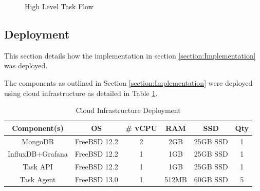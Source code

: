 \documentclass{mscreport}
\begin{document}

\begin{figure}[p]
	\begin{center}
		\caption{High Level Task Flow}
		\label{fig:task_flow}
	\end{center}
\end{figure}

\clearpage
\newpage

\subsection{Deployment}

This section details how the implementation in section \ref{section:Implementation} was deployed.

\vspace{0.3cm} \noindent
The components as outlined in Section \ref{section:Implementation} were deployed using cloud infrastructure as detailed in Table \ref{table:implmentation_cloud}.

\begin{table}[H]
  \begin{center}
    \begin{tabular}{|c|c|c|c|c|c|}  %
      \hline
      \textbf{Component(s)} & \textbf{OS} & \textbf{\# vCPU} & \textbf{RAM} & \textbf{SSD} & \textbf{Qty}\\
      \hline
      MongoDB & FreeBSD 12.2 & 2 & 2GB & 25GB SSD & 1 \\
      \hline
      InfluxDB$+$Grafana & FreeBSD 12.2 & 1 & 1GB & 25GB SSD & 1 \\
      \hline
      Task API & FreeBSD 12.2 & 1 & 1GB & 25GB SSD & 1 \\
      \hline
      Task Agent & FreeBSD 13.0 & 1 & 512MB & 60GB SSD & 5 \\
      \hline
    \end{tabular}
    \caption{Cloud Infrastructure Deployment}
    \label{table:implmentation_cloud} %
  \end{center}
\end{table}
\end{document}
